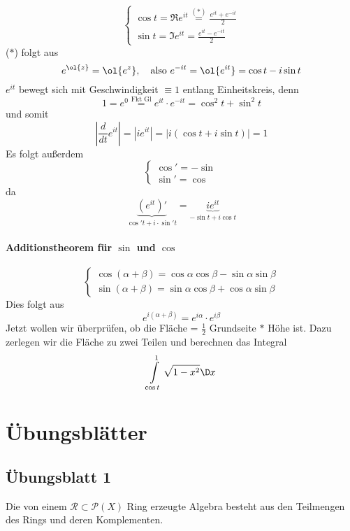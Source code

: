 $$ \begin{cases}
\cos t = \Re e^{it} \overset{(*)}= \frac{e^{it} + e^{-it}}{2}\\
\sin t = \Im e^{it} = \frac{e^{it}-e^{-it}}{2}
\end{cases}$$
($*$) folgt aus
$$
e^{\ol{z}} = \ol{e^z}, \quad \text{also } e^{-it} = \ol{e^{it}} = \cos t - i \sin t
$$
$e^{it}$ bewegt sich mit Geschwindigkeit $\equiv 1$ entlang Einheitskreis, denn
$$1 = e^0 \overset{\text{Fkt Gl}}=e^{it} \cdot e^{-it} = \cos^2 t + \sin^2 t$$
und somit
$$\left|\frac{d}{dt}e^{it}\right| = |ie^{it}| = |i(\cos t + i \sin t)|=1$$
Es folgt außerdem
\begin{equation*}
\begin{cases}
\cos ' = -\sin \\
\sin' = \cos
\end{cases}
\end{equation*}
da
$$
\underbrace{(e^{it})'}_{\cos' t + i\cdot \sin' t} =  \underbrace{i e^{it}}_{-\sin t+ i \cos t}
$$
\paragraph{Additionstheorem für $\sin$ und $\cos$}
\begin{equation*}
\begin{cases}
\cos (\alpha + \beta ) = \cos \alpha \cos \beta - \sin \alpha \sin \beta \\
\sin (\alpha + \beta) = \sin \alpha \cos \beta + \cos \alpha \sin \beta
\end{cases}
\end{equation*}
Dies folgt aus
$$e^{i(\alpha + \beta)} = e^{i\alpha}\cdot e^{i\beta}$$
Jetzt wollen wir überprüfen, ob die Fläche = $\frac{1}{2}$ Grundseite $*$ Höhe ist. Dazu zerlegen wir die Fläche zu zwei Teilen und berechnen das Integral  \Bild
\begin{align*}
\int\limits_{\cos t}^1 \sqrt{1-x^2} \D x
\end{align*}
\newpage
\section{Übungsblätter}
\subsection*{Übungsblatt 1}
\begin{aufgabe}
Die von einem $\mathcal{R} \subset \mathcal{P}(X)$ Ring erzeugte Algebra besteht aus den Teilmengen des Rings und deren Komplementen.
\end{aufgabe}


